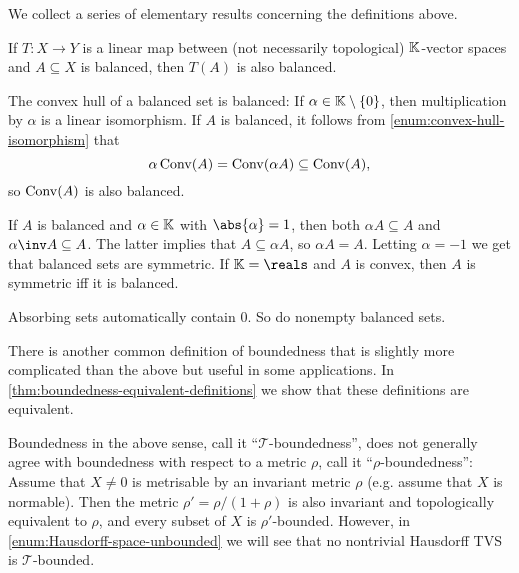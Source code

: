 \documentclass[article, a4paper, 11pt, oneside]{memoir}
\numberwithin{equation}{chapter}
\newcommand{\calT}{\mathcal{T}}
\begin{document}
\begin{remark}
    We collect a series of elementary results concerning the definitions above.
    \begin{enumrem}
        \item \label{rem:transformation-of-balanced-set} If $T \colon X \to Y$ is a linear map between (not necessarily topological) $\mathbb{K}$-vector spaces and $A \subseteq X$ is balanced, then $T(A)$ is also balanced.
        
        \item \label{enum:convex-hull-balanced} The convex hull of a balanced set is balanced: If $\alpha \in \mathbb{K} \setminus \{0\}$, then multiplication by $\alpha$ is a linear isomorphism. If $A$ is balanced, it follows from \cref{enum:convex-hull-isomorphism} that
        \begin{equation*}
            \alpha \operatorname{Conv}(A)
                = \operatorname{Conv}(\alpha A)
                \subseteq \operatorname{Conv}(A),
        \end{equation*}
        so $\operatorname{Conv}(A)$ is also balanced.
        
        \item If $A$ is balanced and $\alpha \in \mathbb{K}$ with $\abs{\alpha} = 1$, then both $\alpha A \subseteq A$ and $\alpha\inv A \subseteq A$. The latter implies that $A \subseteq \alpha A$, so $\alpha A = A$. Letting $\alpha = -1$ we get that balanced sets are symmetric. If $\field = \reals$ and $A$ is convex, then $A$ is symmetric iff it is balanced.
        
        \item Absorbing sets automatically contain $0$. So do nonempty balanced sets.

        \item There is another common definition of boundedness that is slightly more complicated than the above but useful in some applications. In \cref{thm:boundedness-equivalent-definitions} we show that these definitions are equivalent.

        Boundedness in the above sense, call it \enquote{$\calT$-boundedness}, does not generally agree with boundedness with respect to a metric $\rho$, call it \enquote{$\rho$-boundedness}: Assume that $X \neq 0$ is metrisable by an invariant metric $\rho$ (e.g. assume that $X$ is normable). Then the metric $\rho' = \rho/(1 + \rho)$ is also invariant and topologically equivalent to $\rho$, and every subset of $X$ is $\rho'$-bounded. However, in \cref{enum:Hausdorff-space-unbounded} we will see that no nontrivial Hausdorff TVS is $\calT$-bounded.


\end{enumrem}
\end{remark}
\end{document}
